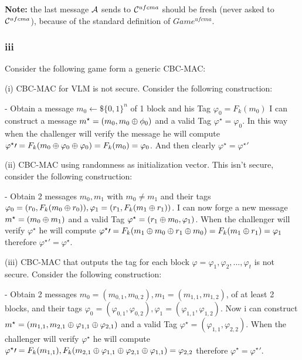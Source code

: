 \documentclass[11pt]{article}
\newcounter{t0d0_counter}
\begin{document}
\textbf{Note:} the last message $\mathcal{A}$ sends to $\mathcal{C}^{ufcma}$ should be fresh
(never asked to $\mathcal{C}^{ufcma}$), because of the standard definition of $Game^{ufcma}$.

\subsubsection{ iii }


Consider the following game form a generic CBC-MAC:

\begin{figure}[h!]
   \centering
   \sdinit{}
\end{figure}

(i)
CBC-MAC for VLM is not secure. Consider the following construction:

- Obtain a message $m_0\leftarrow\$\{0,1\}^n$ of 1 block and his Tag $\varphi_0 =F_k(m_0)$
I can construct a message $m^\star=(m_0,m_0\oplus \phi_0)$ and a valid Tag $\varphi^\star=\varphi_0$.
In this way when the challenger will verify the message he will compute $\varphi^\star\prime=F_k(m_0\oplus\varphi_0\oplus\varphi_0)=F_k(m_0)=\varphi_0$. 
And then clearly $\varphi^\star=\varphi^\star\prime$

(ii)
CBC-MAC using randomness as initialization vector. This isn't secure, consider the following construction:

- Obtain 2 messages $m_0, m_1$ with $m_0\neq m_1$ and their tags $\varphi_0=(r_0,F_k(m_0\oplus r_0)), \varphi_1=(r_1,F_k(m_1\oplus r_1))$.
I can now forge a new message $m^\star=(m_0\oplus m_1)$ and a valid Tag $\varphi^\star=(r_1\oplus m_0, \varphi_1)$.
When the challenger will verify $\varphi^\star$ he will compute
$\varphi^\star\prime=F_k(m_1\oplus m_0\oplus r_1\oplus m_0)=F_k(m_1\oplus r_1)=\varphi_1$
therefore $\varphi^\star\prime=\varphi^\star$.

(iii) 
CBC-MAC that outputs the tag for each block $\varphi=\varphi_1,\varphi_2,...,\varphi_t$ is not secure. Consider the following construction:

- Obtain 2 messages $m_0=(m_{0,1},m_{0,2}), m_1=(m_{1,1},m_{1,2})$, of at least 2 blocks, and their tags 
$\varphi_0=(\varphi_{0,1},\varphi_{0,2}), \varphi_1=(\varphi_{1,1},\varphi_{1,2})$. Now i can construct 
$m^\star=(m_{1,1}, m_{2,1}\oplus\varphi_{1,1}\oplus\varphi_{2,1})$ and a valid Tag 
$\varphi^\star=(\varphi_{1,1}, \varphi_{2,2})$. When the challenger will verify $\varphi^\star$ he will compute
$\varphi^\star\prime=F_k(m_{1,1}),F_k(m_{2,1}\oplus\varphi_{1,1}\oplus\varphi_{2,1}\oplus\varphi_{1,1})=\varphi_{2,2}$
therefore $\varphi^\star=\varphi^\star\prime$.
\end{document}

